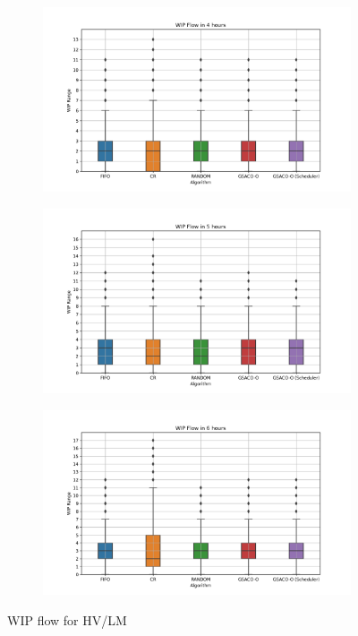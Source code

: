 \begin{figure}[t]
	\begin{subfigure}[b]{0.32\textwidth}
		\includegraphics[width=\textwidth]{HVLM/new_period_14400s.png}
	\end{subfigure}
	\hfill
	\begin{subfigure}[b]{0.32\textwidth}
		\includegraphics[width=\textwidth]{HVLM/new_period_18000s.png}
	\end{subfigure}
	\hfill
	\begin{subfigure}[b]{0.32\textwidth}
		\includegraphics[width=\textwidth]{HVLM/new_period_21600s.png}
	\end{subfigure}
	\caption{WIP flow for HV/LM}
	\label{fig:wip-flows-HVLM}
\end{figure}


